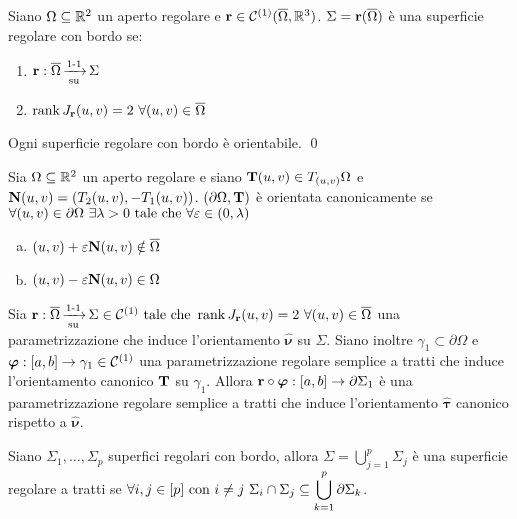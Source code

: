 \begin{definition}
	Siano $\Omega \subseteq \mathbb{R}^2$ un aperto regolare e $\vb{r} \in \mathcal{C}^{(1)}(\overline{\Omega},\mathbb{R}^3)$. $\Sigma = \vb{r}(\overline{\Omega})$ è una superficie regolare con bordo se:
	\begin{enumerate}
		\item $\vb{r}:\overline{\Omega}\operatorname{\xrightarrow[\operatorname{su}]{\operatorname{1-1}}}\Sigma$
		\item $\rank J_{\vb{r}}(u,v) = 2 \ \forall (u,v) \in \overline{\Omega}$
	\end{enumerate}
\end{definition}

\begin{theorem}
	Ogni superficie regolare con bordo è orientabile. \qed
\end{theorem}

\begin{definition}
	Sia $\Omega \subseteq \mathbb{R}^2$ un aperto regolare e siano $\vb{T}(u,v)\in T_{(u,v)}\Omega$ e $\vb{N}(u,v)=(T_2(u,v),-T_1(u,v))$. $(\partial \Omega, \vb{T})$ è orientata canonicamente se $\forall (u,v) \in \partial \Omega \ \exists \lambda > 0 \text{ tale che } \forall \varepsilon \in (0,\lambda)$
	\begin{enumerate}[a.]
		\item $(u,v)+\varepsilon\vb{N}(u,v) \notin \overline{\Omega}$
		\item $(u,v)-\varepsilon\vb{N}(u,v) \in \Omega$
	\end{enumerate}
\end{definition}

\begin{definition}
	Sia $\vb{r}: \overline{\Omega} \operatorname{\xrightarrow[\operatorname{su}]{\operatorname{1-1}}} \Sigma \in \mathcal{C}^{(1)} \text{ tale che } \rank J_{\vb{r}}(u,v)=2 \ \forall (u,v) \in \overline{\Omega}$ una parametrizzazione che induce l'orientamento $\hat{\bm\nu}$ su $\Sigma$. Siano inoltre $\gamma_1 \subset \partial\Omega$ e $\bm\varphi: [a,b]\to \gamma_1 \in \mathcal{C}^{(1)}$ una parametrizzazione regolare semplice a tratti che induce l'orientamento canonico $\vb{T}$ su $\gamma_1$.
	Allora $\vb{r}\circ \bm\varphi:[a,b]\to \partial\Sigma_1$ è una parametrizzazione regolare semplice a tratti che induce l'orientamento $\hat{\bm\tau}$ canonico rispetto a $\hat{\bm\nu}$.
\end{definition}

\begin{definition}
	Siano $\Sigma_1,\dots,\Sigma_p$ superfici regolari con bordo, allora $\displaystyle\Sigma = \bigcup_{j=1}^p \Sigma_j$ è una superficie regolare a tratti se $\forall i,j \in [p] \text{ con } i \neq j \ \Sigma_i \cap \Sigma_j \subseteq \displaystyle\bigcup_{k=1}^p\partial \Sigma_k$.
\end{definition}

